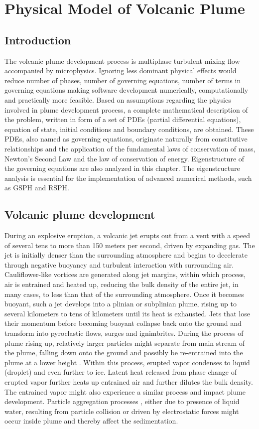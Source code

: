 \chapter{Physical Model of Volcanic Plume} \label{chapter:physics-model}
\section{Introduction}
The volcanic plume development process is multiphase turbulent mixing flow accompanied by microphysics. Ignoring less dominant physical effects would reduce number of phases, number of governing equations, number of terms in governing equations making software development numerically, computationally and practically more feasible. Based on assumptions regarding the physics involved in plume development process, a complete mathematical description of the problem, written in form of a set of PDEs (partial differential equations), equation of state, initial conditions and boundary conditions, are obtained. These PDEs, also named as governing equations, originate naturally
from constitutive relationships and the application of the fundamental laws of conservation of mass, Newton's Second Law and the law of conservation of energy. Eigenstructure of the governing equations are also analyzed in this chapter. The eigenstructure analysis is essential for the implementation of advanced numerical methods, such as GSPH and RSPH.

\section{Volcanic plume development}
During an explosive eruption, a volcanic jet erupts out from a vent with a speed of several tens to more than 150 meters per second, driven by expanding gas. The jet is initially denser than the surrounding atmosphere and begins to decelerate through negative buoyancy and turbulent interaction with surrounding air. Cauliflower-like vortices are generated along jet margins, within which process, air is entrained and heated up, reducing the bulk density of the entire jet, in many cases, to less than that of the surrounding atmosphere. Once it becomes buoyant, such a jet develops into a plinian or subplinian plume, rising up to several kilometers to tens of kilometers until its heat is exhausted. Jets that lose their momentum before becoming buoyant collapse back onto the ground and transform into pyroclastic flows, surges and ignimbrites. During the process of plume rising up, relatively larger particles might separate from main stream of the plume, falling down onto the ground and possibly be re-entrained into the plume at a lower height \citep{ernst1996sedimentation}. Within this process, erupted vapor condenses to liquid (droplet) and even further to ice. Latent heat released from phase change of erupted vapor further heats up entrained air and further dilutes the bulk density. The entrained vapor might also experience a similar process and impact plume development. Particle aggregation processes \citep{carey1982influence,taddeucci2011aggregation}, either due to presence of liquid water, resulting from particle collision or driven by electrostatic forces might occur inside plume and thereby affect the sedimentation. 

